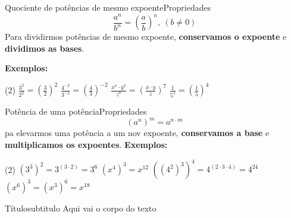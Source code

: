 \documentclass[aspectratio=169,11pt]{if-beamer}
\begin{document}
    \begin{frame}{Quociente de potências de mesmo expoente}{Propriedades}
        \[\frac{a^n}{b^n} = \left( \frac{a}{b} \right)^n,~(b \neq 0) \]
        Para dividirmos potências de mesmo expoente, \textbf{conservamos o expoente} e \textbf{dividimos as bases}.
        
        
        \vspace{1cm}
        \textbf{Exemplos:}
        \begin{tasks}(2)
            \task \(\frac{3^2}{2^2} = \left(\frac{3}{2} \right)^2\)
            \task \(\frac{4^{-2}}{3^{-2}} = \left( \frac{4}{3}\right)^{-2}\)
            \task \(\frac{x^7 \cdot y^7}{z^7} = \left(\frac{x \cdot y}{z} \right)^7\)
            \task \(\frac{1}{5^4} = \left( \frac{1}{5}\right)^4\)
        \end{tasks}
    \end{frame}
    
    \begin{frame}{Potência de uma potência}{Propriedades}
        \[(a^n)^m = a^{n \cdot m}\]
        pa elevarmos uma potência a um nov expoente, \textbf{conservamos a base} e \textbf{multiplicamos os expoentes}.
        \vspace{1cm}
        \textbf{Exemplos:}
        \begin{tasks}(2)
            \task \((3^3)^2 = 3^{(3 \cdot 2)} = 3^6\)
            \task \((x^4)^3 = x^{12}\)
            \task \(\left( \left( 4^2 \right)^3 \right)^4 = 4^{(2 \cdot 3 \cdot 4)} = 4^{24}\)
            \task \((x^6)^3 = (x^3)^6 = x^{18}\)
        \end{tasks}
    \end{frame}
    
    
    \begin{frame}{Título}{subtitulo}
        Aqui vai o corpo do texto
        
    \end{frame}
\end{document}
